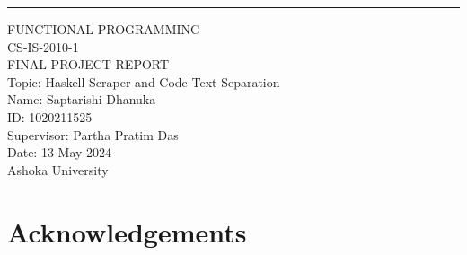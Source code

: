 \documentclass[12pt]{scrreprt}
\begin{document}













\begin{flushright}
    \rule{16cm}{5pt}\vskip1cm
    \begin{bfseries}
        \Huge{FUNCTIONAL PROGRAMMING \\ CS-IS-2010-1 \\ FINAL PROJECT REPORT }\\
        \vspace{1.1cm}
        Topic: Haskell Scraper and Code-Text Separation\\
        \vspace{1.1cm}
        Name: Saptarishi Dhanuka\\
        \vspace{1.1cm}
        ID: 1020211525\\
        \vspace{1.1cm}
        Supervisor: Partha Pratim Das\\
        \vspace{1.1cm}
        Date: 13 May 2024\\
        \vspace{1.1cm}
        Ashoka University\\
    \end{bfseries}
\end{flushright}

\tableofcontents


\chapter{Acknowledgements}
\end{document}
